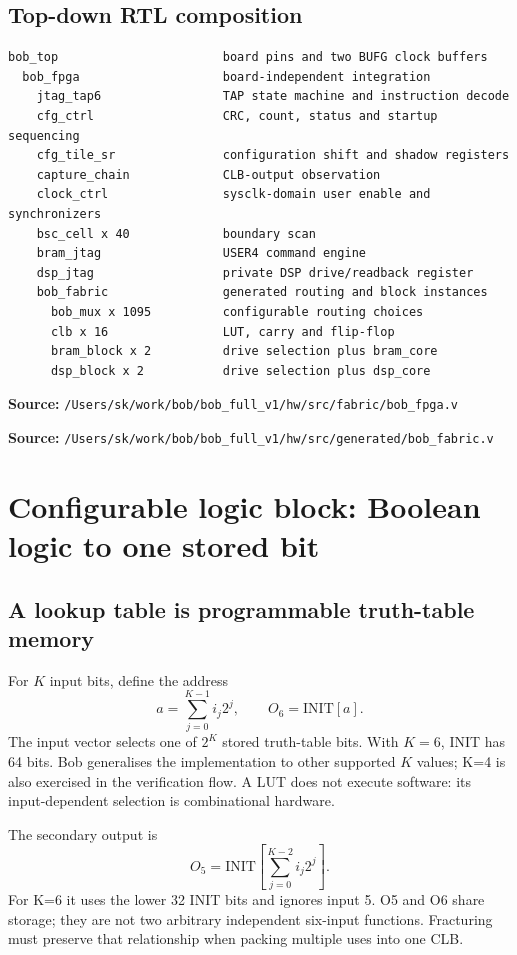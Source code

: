 \documentclass[11pt,a4paper]{article}
\newcommand{\src}[1]{\par\smallskip\noindent\textbf{Source: }\nolinkurl{/Users/sk/work/bob/bob_full_v1/#1}\par\smallskip}
\begin{document}
\subsection{Top-down RTL composition}
\begin{lstlisting}[caption={Main hardware hierarchy}]
bob_top                       board pins and two BUFG clock buffers
  bob_fpga                    board-independent integration
    jtag_tap6                 TAP state machine and instruction decode
    cfg_ctrl                  CRC, count, status and startup sequencing
    cfg_tile_sr               configuration shift and shadow registers
    capture_chain             CLB-output observation
    clock_ctrl                sysclk-domain user enable and synchronizers
    bsc_cell x 40             boundary scan
    bram_jtag                 USER4 command engine
    dsp_jtag                  private DSP drive/readback register
    bob_fabric                generated routing and block instances
      bob_mux x 1095          configurable routing choices
      clb x 16                LUT, carry and flip-flop
      bram_block x 2          drive selection plus bram_core
      dsp_block x 2           drive selection plus dsp_core
\end{lstlisting}
\src{hw/src/fabric/bob_fpga.v}
\src{hw/src/generated/bob_fabric.v}

\section{Configurable logic block: Boolean logic to one stored bit}
\label{sec:clb}
\subsection{A lookup table is programmable truth-table memory}
For $K$ input bits, define the address
\[
a=\sum_{j=0}^{K-1}i_j2^j,\qquad O_6=\mathrm{INIT}[a].
\]
The input vector selects one of $2^K$ stored truth-table bits. With $K=6$, INIT
has 64 bits. Bob generalises the implementation to other supported $K$ values;
K=4 is also exercised in the verification flow. A LUT does not execute software:
its input-dependent selection is combinational hardware.

The secondary output is
\[
O_5=\mathrm{INIT}\left[\sum_{j=0}^{K-2}i_j2^j\right].
\]
For K=6 it uses the lower 32 INIT bits and ignores input 5. O5 and O6 share
storage; they are not two arbitrary independent six-input functions. Fracturing
must preserve that relationship when packing multiple uses into one CLB.
\end{document}
